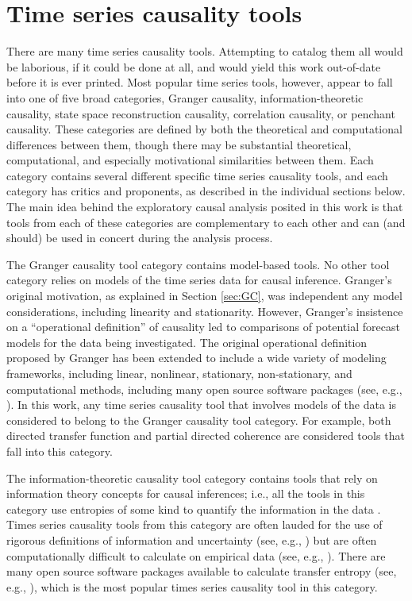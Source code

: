 \chapter{Time series causality tools}
\label{sec:tools}
There are many time series causality tools.  Attempting to catalog them all would be laborious, if it could be done at all, and would yield this work out-of-date before it is ever printed.  Most popular time series tools, however, appear to fall into one of five broad categories, Granger causality, information-theoretic causality, state space reconstruction causality, correlation causality, or penchant causality.  These categories are defined by both the theoretical and computational differences between them, though there may be substantial theoretical, computational, and especially motivational similarities between them.  Each category contains several different specific time series causality tools, and each category has critics and proponents, as described in the individual sections below.  The main idea behind the exploratory causal analysis posited in this work is that tools from each of these categories are complementary to each other and can (and should) be used in concert during the analysis process.

The Granger causality tool category contains model-based tools.  No other tool category relies on models of the time series data for causal inference.  Granger's original motivation, as explained in Section \ref{sec:GC}, was independent any model considerations, including linearity and stationarity.  However, Granger's insistence on a ``operational definition'' of causality \cite{Granger1963} led to comparisons of potential forecast models for the data being investigated.  The original operational definition proposed by Granger has been extended to include a wide variety of modeling frameworks, including linear, nonlinear, stationary, non-stationary, and computational methods, including many open source software packages (see, e.g., \cite{Cui2008,Luo2013,Tana2012,Barnett2014,Zang2012,Seth2010}).  In this work, any time series causality tool that involves models of the data is considered to belong to the Granger causality tool category.  For example, both directed transfer function \cite{Kaminski1991} and partial directed coherence \cite{Baccala2001} are considered tools that fall into this category.

The information-theoretic causality tool category contains tools that rely on information theory concepts for causal inferences; i.e., all the tools in this category use entropies of some kind to quantify the information in the data \cite{ITbook_placeholder}.  Times series causality tools from this category are often lauded for the use of rigorous definitions of information and uncertainty (see, e.g., \cite{Schindler2007}) but are often computationally difficult to calculate on empirical data (see, e.g., \cite{Kaiser2002}).  There are many open source software packages available to calculate transfer entropy (see, e.g., \cite{Wibral2014,Lindner2011,Montalto2014,Lizier2014}), which is the most popular times series causality tool in this category.  

